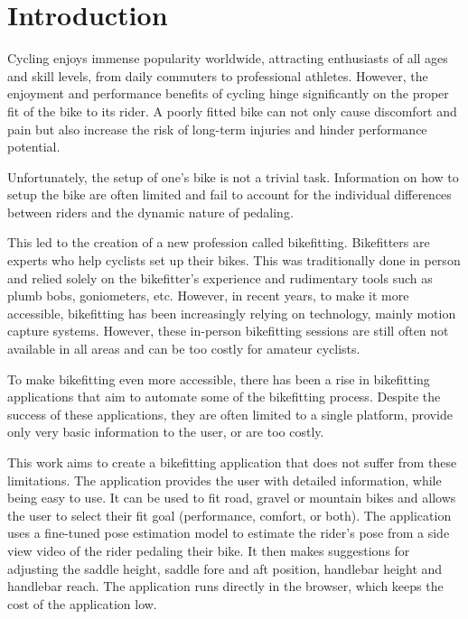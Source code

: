 
% 

\chapter{Introduction}
Cycling enjoys immense popularity worldwide, attracting enthusiasts of all ages and skill levels, from daily commuters to professional athletes. However, the enjoyment and performance benefits of cycling hinge significantly on the proper fit of the bike to its rider. A poorly fitted bike can not only cause discomfort and pain but also increase the risk of long-term injuries and hinder performance potential.

Unfortunately, the setup of one's bike is not a trivial task. Information on how to setup the bike are often limited and fail to account for the individual differences between riders and the dynamic nature of pedaling.

This led to the creation of a new profession called bikefitting. Bikefitters are experts who help cyclists set up their bikes. This was traditionally done in person and relied solely on the bikefitter's experience and rudimentary tools such as plumb bobs, goniometers, etc. However, in recent years, to make it more accessible, bikefitting has been increasingly relying on technology, mainly motion capture systems. However, these in-person bikefitting sessions are still often not available in all areas and can be too costly for amateur cyclists.

To make bikefitting even more accessible, there has been a rise in bikefitting applications that aim to automate some of the bikefitting process. Despite the success of these applications, they are often limited to a single platform, provide only very basic information to the user, or are too costly.

This work aims to create a bikefitting application that does not suffer from these limitations. The application provides the user with detailed information, while being easy to use. It can be used to fit road, gravel or mountain bikes and allows the user to select their fit goal (performance, comfort, or both). The application uses a fine-tuned pose estimation model to estimate the rider's pose from a side view video of the rider pedaling their bike. It then makes suggestions for adjusting the saddle height, saddle fore and aft position, handlebar height and handlebar reach. The application runs directly in the browser, which keeps the cost of the application low.

